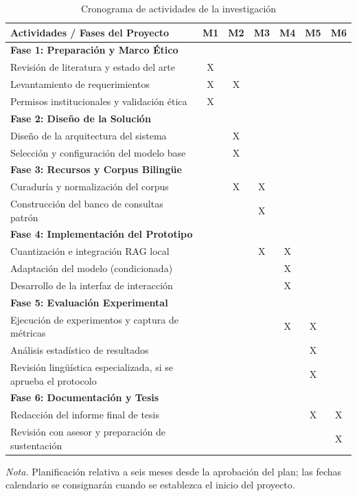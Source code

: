 \begin{table}[H]
\centering
\small
\begin{threeparttable}
\caption{Cronograma de actividades de la investigación}
\label{tab:cronograma_actividades}
\begin{tabularx}{\textwidth}{L c c c c c c}
\toprule
\textbf{Actividades / Fases del Proyecto} & \textbf{M1} & \textbf{M2} & \textbf{M3} & \textbf{M4} & \textbf{M5} & \textbf{M6} \\
\midrule
\textbf{Fase 1: Preparación y Marco Ético} & & & & & & \\
Revisión de literatura y estado del arte & X & & & & & \\
Levantamiento de requerimientos & X & X & & & & \\
Permisos institucionales y validación ética & X & & & & & \\
\midrule
\textbf{Fase 2: Diseño de la Solución} & & & & & & \\
Diseño de la arquitectura del sistema & & X & & & & \\
Selección y configuración del modelo base & & X & & & & \\
\midrule
\textbf{Fase 3: Recursos y Corpus Bilingüe} & & & & & & \\
Curaduría y normalización del corpus & & X & X & & & \\
Construcción del banco de consultas patrón & & & X & & & \\
\midrule
\textbf{Fase 4: Implementación del Prototipo} & & & & & & \\
Cuantización e integración RAG local & & & X & X & & \\
Adaptación del modelo (condicionada) & & & & X & & \\
Desarrollo de la interfaz de interacción & & & & X & & \\
\midrule
\textbf{Fase 5: Evaluación Experimental} & & & & & & \\
Ejecución de experimentos y captura de métricas & & & & X & X & \\
Análisis estadístico de resultados & & & & & X & \\
Revisión lingüística especializada, si se aprueba el protocolo & & & & & X & \\
\midrule
\textbf{Fase 6: Documentación y Tesis} & & & & & & \\
Redacción del informe final de tesis & & & & & X & X \\
Revisión con asesor y preparación de sustentación & & & & & & X \\
\bottomrule
\end{tabularx}
\begin{tablenotes}
\item \textit{Nota.} Planificación relativa a seis meses desde la aprobación del plan; las fechas calendario se consignarán cuando se establezca el inicio del proyecto.
\end{tablenotes}
\end{threeparttable}
\end{table}

